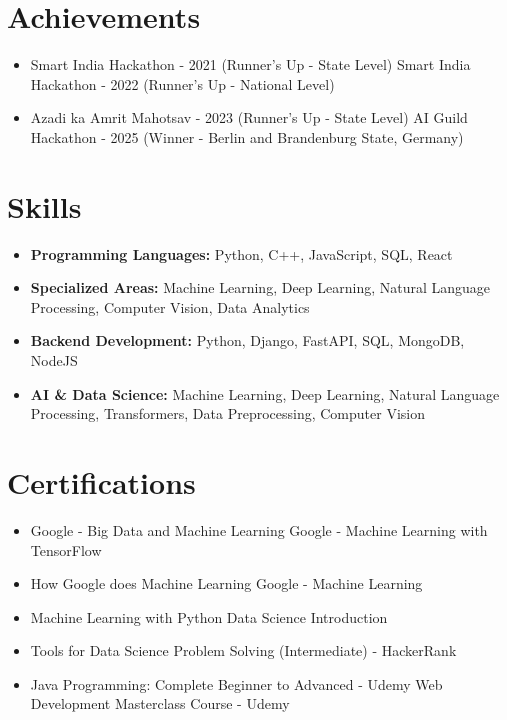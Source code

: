 \documentclass[a4paper,10pt]{article}
\begin{document}
\section*{Achievements}
\begin{itemize}
\item Smart India Hackathon - 2021 (Runner's Up - State Level) \hfill Smart India Hackathon - 2022 (Runner's Up - National Level)
\item Azadi ka Amrit Mahotsav - 2023 (Runner's Up - State Level) \hfill AI Guild Hackathon - 2025 (Winner - Berlin and Brandenburg State, Germany)
\end{itemize}

\section*{Skills}
\begin{itemize}
  \item \textbf{Programming Languages:} Python, C++, JavaScript, SQL, React
  \item \textbf{Specialized Areas:} Machine Learning, Deep Learning, Natural Language Processing, Computer Vision, Data Analytics
  \item \textbf{Backend Development:} Python, Django, FastAPI, SQL, MongoDB, NodeJS
  \item \textbf{AI \& Data Science:} Machine Learning, Deep Learning, Natural Language Processing, Transformers, Data Preprocessing, Computer Vision
\end{itemize}

\section*{Certifications}
\begin{itemize}
\item Google - Big Data and Machine Learning \hfill Google - Machine Learning with TensorFlow
\item How Google does Machine Learning \hfill Google - Machine Learning
\item Machine Learning with Python \hfill Data Science Introduction
\item Tools for Data Science \hfill Problem Solving (Intermediate) - HackerRank
\item Java Programming: Complete Beginner to Advanced - Udemy \hfill Web Development Masterclass Course - Udemy
\end{itemize}
\end{document}

